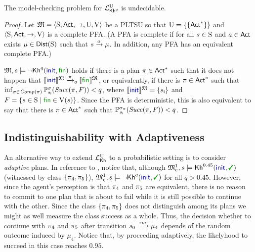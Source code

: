 \begin{theorem}\label{th:mc:PKhunc:undecidable}
  The model-checking problem for $\PKhunc$ is undecidable.
\end{theorem}
%
\begin{proof}
  Let $\model=\tup{\S,\Act,\ra,\Unc,\V}$ be a PLTSU so that
  $\Unc=\{\{\Act^*\}\}$ and $\tup{\S,\Act,\ra,\V}$ is a complete PFA.
  (A PFA is complete if for all $s\in\S$ and $a\in\Act$ exists
  $\mu\in\Dist(\S)$ such that $s\reach{a}\mu$. In addition, any PFA
  has an equivalent complete PFA.)

  $\model,s\models\neg\kh^q(\init,\fin)$ holds if there is a plan
  ${\plan\in \Act^*}$ such that it does not happen that
  ${\truthset{\model}{\init}\reach{\plan}_q\truthset{\model}{\fin}}$,
  or equivalently, if there is $\plan\in \Act^*$  such that
  $\inf_{\strat\in\Comp(\plan)}\Prob^\strat_{s_{\textsf{i}}}(\Succ(\plan,F)) < q$,
  where $\truthset{\model}{\init}=\{s_{\textsf{i}}\}$ and
  $F=\{{s\in\S}\mid{\fin\in\V(s)}\}$.
  Since the PFA is deterministic, this is also equivalent to say that
  there is $\plan\in \Act^*$ such that
  $\Prob^{\strat_\plan}_{s_{\textsf{i}}}(\Succ(\plan,F)) < q$.
  

\end{proof}
  


\subsection{Indistinguishability with Adaptiveness}\label{subsec:prob:indist:adaptive}

An alternative way to extend $\Khunc$ to a probabilistic setting is to
consider \emph{adaptive} plans.
%
In reference to , notice that, although
$\modelex^1,s \models \kh^{0.45}(\init,\goal)$ (witnessed by class
$\{\plan_4,\plan_5\}$), $\modelex^1,s \models \neg\kh^q(\init,\goal)$
for all $q>0.45$.
%
However, since the agent's perception is that $\plan_4$ and $\plan_5$
are equivalent, there is no reason to commit to one plan that is about
to fail while it is still possible to continue with the other.  Since
the class $\{\plan_4,\plan_5\}$ does not distinguish among its plans
we might as well measure the class success as a whole.
%
Thus, the decision whether to continue with $\plan_4$ and $\plan_5$
after transition $s_0\reach{\ramp}\mu_4$ depends of the random outcome
induced by $\mu_4$.  Notice that, by proceeding adaptively, the
likelyhood to succeed in this case reaches $0.95$.

